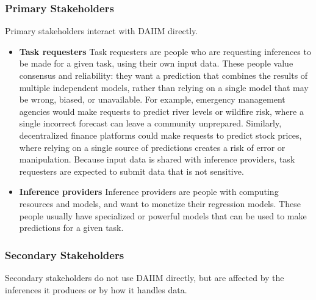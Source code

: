 \documentclass[12pt]{article}
\begin{document}
\subsubsection*{Primary Stakeholders}

Primary stakeholders interact with DAIIM directly.

\begin{itemize}
    \item \textbf{Task requesters} \newline
    Task requesters are people who are requesting inferences to be made for a given task, using their own input data.
    These people value consensus and reliability: they want a prediction that combines the results of multiple independent models, rather than relying on a single model that may be wrong, biased, or unavailable.
    For example, emergency management agencies would make requests to predict river levels or wildfire risk, where a single incorrect forecast can leave a community unprepared.
    Similarly, decentralized finance platforms could make requests to predict stock prices, where relying on a single source of predictions creates a risk of error or manipulation.
    Because input data is shared with inference providers, task requesters are expected to submit data that is not sensitive.

    \item \textbf{Inference providers} \newline
    Inference providers are people with computing resources and models, and want to monetize their regression models.
    These people usually have specialized or powerful models that can be used to make predictions for a given task.
\end{itemize}

\subsubsection*{Secondary Stakeholders}

Secondary stakeholders do not use DAIIM directly, but are affected by the inferences it produces or by how it handles data.
\end{document}
